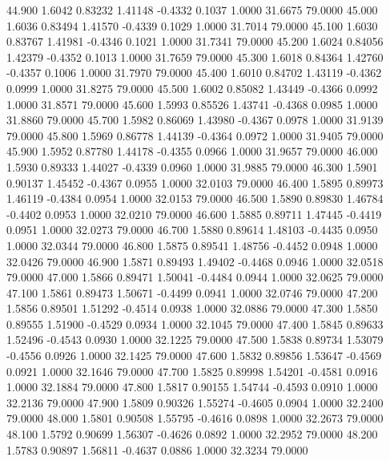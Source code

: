   44.900   1.6042   0.83232   1.41148  -0.4332   0.1037   1.0000  31.6675  79.0000
  45.000   1.6036   0.83494   1.41570  -0.4339   0.1029   1.0000  31.7014  79.0000
  45.100   1.6030   0.83767   1.41981  -0.4346   0.1021   1.0000  31.7341  79.0000
  45.200   1.6024   0.84056   1.42379  -0.4352   0.1013   1.0000  31.7659  79.0000
  45.300   1.6018   0.84364   1.42760  -0.4357   0.1006   1.0000  31.7970  79.0000
  45.400   1.6010   0.84702   1.43119  -0.4362   0.0999   1.0000  31.8275  79.0000
  45.500   1.6002   0.85082   1.43449  -0.4366   0.0992   1.0000  31.8571  79.0000
  45.600   1.5993   0.85526   1.43741  -0.4368   0.0985   1.0000  31.8860  79.0000
  45.700   1.5982   0.86069   1.43980  -0.4367   0.0978   1.0000  31.9139  79.0000
  45.800   1.5969   0.86778   1.44139  -0.4364   0.0972   1.0000  31.9405  79.0000
  45.900   1.5952   0.87780   1.44178  -0.4355   0.0966   1.0000  31.9657  79.0000
  46.000   1.5930   0.89333   1.44027  -0.4339   0.0960   1.0000  31.9885  79.0000
  46.300   1.5901   0.90137   1.45452  -0.4367   0.0955   1.0000  32.0103  79.0000
  46.400   1.5895   0.89973   1.46119  -0.4384   0.0954   1.0000  32.0153  79.0000
  46.500   1.5890   0.89830   1.46784  -0.4402   0.0953   1.0000  32.0210  79.0000
  46.600   1.5885   0.89711   1.47445  -0.4419   0.0951   1.0000  32.0273  79.0000
  46.700   1.5880   0.89614   1.48103  -0.4435   0.0950   1.0000  32.0344  79.0000
  46.800   1.5875   0.89541   1.48756  -0.4452   0.0948   1.0000  32.0426  79.0000
  46.900   1.5871   0.89493   1.49402  -0.4468   0.0946   1.0000  32.0518  79.0000
  47.000   1.5866   0.89471   1.50041  -0.4484   0.0944   1.0000  32.0625  79.0000
  47.100   1.5861   0.89473   1.50671  -0.4499   0.0941   1.0000  32.0746  79.0000
  47.200   1.5856   0.89501   1.51292  -0.4514   0.0938   1.0000  32.0886  79.0000
  47.300   1.5850   0.89555   1.51900  -0.4529   0.0934   1.0000  32.1045  79.0000
  47.400   1.5845   0.89633   1.52496  -0.4543   0.0930   1.0000  32.1225  79.0000
  47.500   1.5838   0.89734   1.53079  -0.4556   0.0926   1.0000  32.1425  79.0000
  47.600   1.5832   0.89856   1.53647  -0.4569   0.0921   1.0000  32.1646  79.0000
  47.700   1.5825   0.89998   1.54201  -0.4581   0.0916   1.0000  32.1884  79.0000
  47.800   1.5817   0.90155   1.54744  -0.4593   0.0910   1.0000  32.2136  79.0000
  47.900   1.5809   0.90326   1.55274  -0.4605   0.0904   1.0000  32.2400  79.0000
  48.000   1.5801   0.90508   1.55795  -0.4616   0.0898   1.0000  32.2673  79.0000
  48.100   1.5792   0.90699   1.56307  -0.4626   0.0892   1.0000  32.2952  79.0000
  48.200   1.5783   0.90897   1.56811  -0.4637   0.0886   1.0000  32.3234  79.0000
